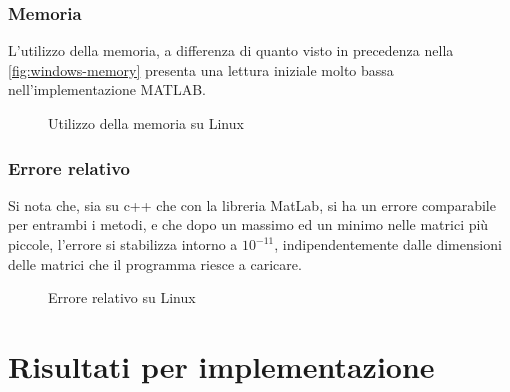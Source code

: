 \documentclass[11pt,italian]{article}
\begin{document}
\subsubsection*{Memoria}
L'utilizzo della memoria, a differenza di quanto visto in precedenza nella \cref{fig:windows-memory} presenta una lettura iniziale molto bassa nell'implementazione MATLAB.
\begin{figure}[H]
    \caption{Utilizzo della memoria su Linux}
    \label{fig:linux-memory}
\end{figure}

\smallskip
\subsubsection*{Errore relativo}
Si nota che, sia su c++ che con la libreria MatLab, si ha un errore comparabile per entrambi i metodi, e che dopo un massimo ed un minimo nelle matrici più piccole, l'errore si stabilizza intorno a $10^{-11}$, indipendentemente dalle dimensioni delle matrici che il programma riesce a caricare.
\begin{figure}[H]
    \caption{Errore relativo su Linux}
    \label{fig:linux-error}
\end{figure}

\newpage
\section{Risultati per implementazione}
\label{section-results-os}
\end{document}
